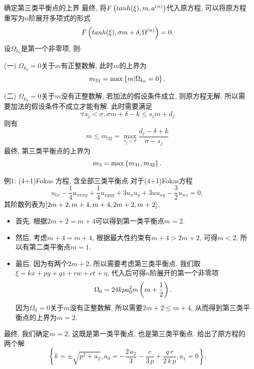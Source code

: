 \begin{frame}{确定第三类平衡点的上界}
\small 
最终, 将$F\left(tanh(\xi),m,a^{(n)}\right)$代入原方程, 可以将原方程重写为$n$阶展开多项式的形式
\[
    F\left(tanh(\xi),\sigma m+\delta,\Omega^{(n)}\right)=0 .
\]
设$\Omega_{k_0}$是第一个非零项, 则: 

(一) $\Omega_{k_0}=0$关于$m$有正整数解, 此时$m$的上界为
\[
    m_{31}=\max\left\{m|\Omega_{k_0}=0\right\}.
\]

(二) $\Omega_{k_0}=0$关于$m$没有正整数解, 若加法的假设条件成立, 则原方程无解, 所以需要加法的假设条件不成立才能有解. 此时需要满足 
\[
    \forall s_j<\sigma, \sigma m + \delta - k \le s_j m + d_j
\]
则有
\[
    m\le m_{32} = \underset{s_j<\sigma}{\max}{\frac{d_j-\delta+k}{\sigma-s_j}}
\]
最终, 第三类平衡点的上界为 
\[
    m_3 = \max\left\{m_{31},m_{32}\right\}. 
\]
\end{frame}

\begin{frame}{例1: (4+1)Fokas 方程, 含全部三类平衡点}
\small 
对于(4+1)Fokas方程
\begin{equation*}
    u_{tx}-\frac{1}{4}u_{xxxy}+\frac{1}{4}u_{xyyy}+3u_xu_y+3uu_{xy}-\frac{3}{2}u_{wz}=0 ,
\end{equation*}
其阶数列表为$\left[2m+2,m+4,m+4,2m+2,m+2\right]$. 
\begin{itemize}
\item 首先, 根据$2m+2=m+4$可以得到第一类平衡点$m=2$.
\item 然后, 考虑$m+4=m+4$, 根据最大性约束有$m+4>2m+2$, 可得$m<2$, 所以有第二类平衡点$m=1$.
\item 最后, 因为有两个$2m+2$, 所以需要考虑第三类平衡点. 我们取$\xi=kx+py+qz+rw+ct+\eta$, 代入后可得$n$阶展开的第一个非零项
\begin{equation*}
    \Omega_0 = 24kpa_0^2m\left(m+\frac{1}{2}\right). 
\end{equation*}
因为$\Omega_0=0$关于$m$没有正整数解, 所以需要$2m+2\le m+4$, 从而得到第三类平衡点的上界为$m=2$.
\end{itemize}
\end{frame}

\begin{frame}
最终, 我们确定$m=2$, 这既是第一类平衡点, 也是第三类平衡点. 给出了原方程的两个解
\begin{equation*}
    \left\{ k=\pm \sqrt {{p}^{2}+{{a}_{2}}},{{a}_{0}}=-\frac{2\,{{a}_{2}}}{3}-\frac{c}{3\,p}+ \frac{q\,r}{2\,k\,p},{{a}_{1}}=0\right\} .
\end{equation*}
\end{frame}


